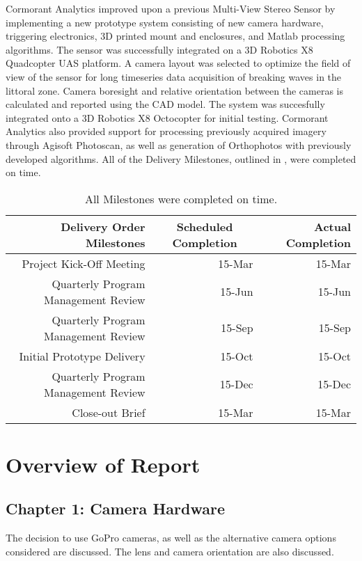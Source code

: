 	Cormorant Analytics improved upon a previous Multi-View Stereo Sensor by implementing a new prototype system consisting of new camera hardware, triggering electronics, 3D printed mount and enclosures, and Matlab processing algorithms.  The sensor was successfully integrated on a 3D Robotics X8 Quadcopter UAS platform.  A camera layout was selected to optimize the field of view of the sensor for long timeseries data acquisition of breaking waves in the littoral zone.  Camera boresight and relative orientation between the cameras is calculated and reported using the CAD model.  The system was succesfully integrated onto a 3D Robotics X8 Octocopter for initial testing.
	Cormorant Analytics also provided support for processing previously acquired imagery through Agisoft Photoscan, as well as generation of Orthophotos with previously developed algorithms.  All of the Delivery Milestones, outlined in , were completed on time.
	\begin{table}[htbp]
		\centering
		\caption{All Milestones were completed on time.}
		\begin{tabular}{rrr}
			\toprule
			\textbf{Delivery Order Milestones} & \multicolumn{1}{c}{\textbf{Scheduled Completion}} & \textbf{Actual Completion} \\
			\midrule
			Project Kick-Off Meeting & 15-Mar & 15-Mar \\
			Quarterly Program Management Review & 15-Jun & 15-Jun \\
			Quarterly Program Management Review  & 15-Sep & 15-Sep \\
			Initial Prototype Delivery & 15-Oct & 15-Oct \\
			Quarterly Program Management Review & 15-Dec & 15-Dec \\
			Close-out Brief & 15-Mar & 15-Mar \\
			\bottomrule
		\end{tabular}%
		\label{tab:milestone}%
	\end{table}%
	\vspace{-1em}
	\section*{Overview of Report}
	\subsection*{Chapter 1: Camera Hardware}
	The decision to use GoPro cameras, as well as the alternative camera options considered are discussed.  The lens and camera orientation are also discussed.
	\vspace{-.2em}
